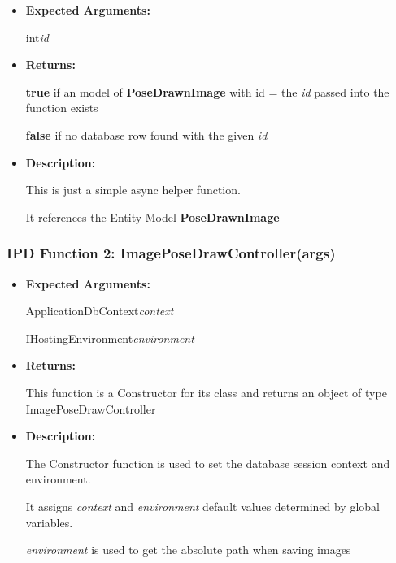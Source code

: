 \documentclass{scrreprt}
\begin{document}
\begin{itemize}
        \item \textbf{Expected Arguments:}

                int\quad\textit{id}

        \item \textbf{Returns:}

                \textbf{true} if an model of \textbf{PoseDrawnImage} with id =
                the \textit{id} passed into the function exists

                \textbf{false} if no database row found with the given
                \textit{id}

        \item \textbf{Description:}

                This is just a simple async helper function.

                It references the Entity Model \textbf{PoseDrawnImage}
\end{itemize}

\subsubsection{IPD Function 2: ImagePoseDrawController(args)}

\begin{itemize}
        \item \textbf{Expected Arguments:}

                ApplicationDbContext\quad\textit{context}

                IHostingEnvironment\quad\textit{environment}

        \item \textbf{Returns:}

                This function is a Constructor for its class and returns an
                object of type ImagePoseDrawController

        \item \textbf{Description:}

                The Constructor function is used to set the database session
                context and environment.

                It assigns \textit{context} and \textit{environment} default
                values determined by global variables.

                \textit{environment} is used to get the absolute path when
                saving images
\end{itemize}
\end{document}
